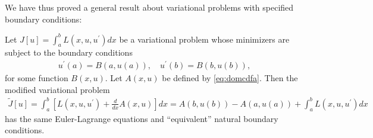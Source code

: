 \documentclass{article}
\begin{document}
We have thus proved a general result about variational problems with specified boundary conditions:
\begin{thma}
Let $J[u]=\int_{a}^{b} L\left(x, u, u^{\prime}\right) d x$ be a variational problem whose minimizers are subject to the boundary conditions
\begin{align*}
u^{\prime}(a)=B(a, u(a)), \quad u^{\prime}(b)=B(b, u(b)),
\end{align*}
for some function $B(x, u)$. Let $A(x, u)$ be defined by \cref{eq:domcdfa}. Then the modified variational problem
\begin{align}
\widetilde{J}[u]=\int_{a}^{b}\left[L\left(x, u, u^{\prime}\right)+\frac{d}{d x} A(x, u)\right] d x=A(b, u(b))-A(a, u(a))+\int_{a}^{b} L\left(x, u, u^{\prime}\right) d x \label{eq:doncdfad}
\end{align}
has the same Euler-Lagrange equations and ``equivalent'' natural boundary conditions. 
\end{thma}
\end{document}
